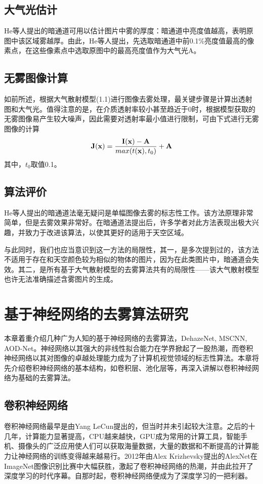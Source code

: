 \documentclass[a4paper, 12pt]{report}
\begin{document}
\section{大气光估计\quad}
He等人提出的{\Large 暗通道可用以估计图片中雾的厚度}：暗通道中亮度值越高，表明原图中该区域雾越厚。由此，He等人提出，先选取暗通道中前0.1\%亮度值最高的像素点，在这些像素点中选取原图中的最高亮度值作为大气光A。

\section{无雾图像计算\quad}
如前所述，根据大气散射模型(1.1)进行图像去雾处理，最关键步骤是计算出透射图和大气光。值得注意的是，在介质透射率较小甚至趋近于0时，根据模型获取的无雾图像易产生较大噪声，因此需要对透射率最小值进行限制，可由下式进行无雾图像的计算
\begin{equation}
{\bf J(x)} = \frac{\bf I(x) - A}{max(t({\bf x}), t_0)} + {\bf A}
\end{equation}
其中，$t_0$取值0.1。

\section{算法评价\quad}
He等人提出的暗通道法毫无疑问是单幅图像去雾的标志性工作。该方法原理非常简单，但是去雾效果非常好。在暗通道法提出后，许多学者对此方法表现出极大兴趣，并致力于改进该算法，以使其更好的适用于天空区域。

与此同时，我们也应当意识到这一方法的局限性，其一，是多次提到过的，该方法不适用于存在和天空颜色较为相似的物体的图片，因为在此类图片中，暗通道会失效。其二，是所有基于大气散射模型的去雾算法共有的局限性——该大气散射模型也许无法准确描述含雾图片的生成。

\chapter{基于神经网络的去雾算法研究\quad}
本章着重介绍几种广为人知的基于神经网络的去雾算法，DehazeNet, MSCNN, AOD-Net。神经网络以其强大的非线性拟合能力在学界掀起了一股热潮，而卷积神经网络以其对图像的卓越处理能力成为了计算机视觉领域的标志性算法。本章将先介绍卷积神经网络的基本结构，如卷积层、池化层等，再深入讲解以卷积神经网络为基础的去雾算法。

\section{卷积神经网络\quad}
卷积神经网络最早是由Yang LeCun提出的，但当时并未引起较大注意。之后的十几年，计算能力显著提高，CPU越来越快，GPU成为常用的计算工具，智能手机、摄像头的广泛应用使人们可以获取海量数据，大量的数据和不断提高的计算能力让神经网络的训练变得越来越易行。2012年由Alex Krizhevsky提出的AlexNet在ImageNet图像识别比赛中大幅获胜，激起了卷积神经网络的热潮，并由此拉开了深度学习的时代序幕。自那时起，卷积神经网络便成为了深度学习的一把利器。
\end{document}
